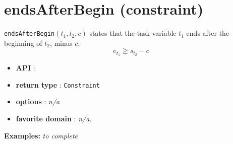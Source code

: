 \section{endsAfterBegin (constraint)}\label{endsafterbegin:endsafterbeginconstraint}\hypertarget{endsafterbegin:endsafterbeginconstraint}{}

\begin{notedef}
\texttt{endsAfterBegin}$(t_1,t_2,c)$ states that the task variable $t_1$ ends after the beginning of $t_2$, minus $c$:
  $$e_{t_{1}} \ge s_{t_{2}} - c$$
\end{notedef}

\begin{itemize}
	\item \textbf{API} :
	\item \textbf{return type} : \texttt{Constraint}
	\item \textbf{options} : \emph{n/a}
	\item \textbf{favorite domain} : \emph{n/a}.
\end{itemize}

\textbf{Examples:}
%
\emph{to complete}
